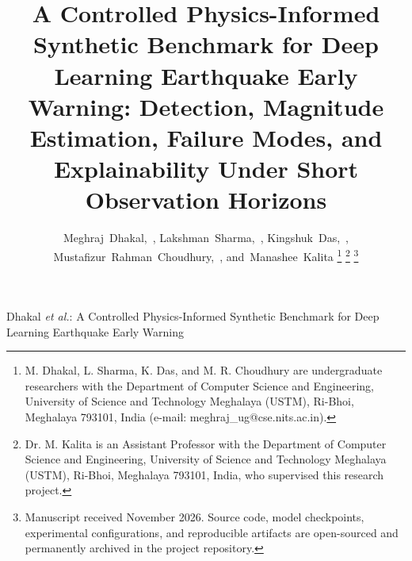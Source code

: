 \documentclass[journal]{IEEEtran}
\begin{document}
\title{A Controlled Physics-Informed Synthetic Benchmark for Deep Learning Earthquake Early Warning: Detection, Magnitude Estimation, Failure Modes, and Explainability Under Short Observation Horizons}

\author{Meghraj~Dhakal,~,
        Lakshman~Sharma,~,
        Kingshuk~Das,~,
        Mustafizur~Rahman~Choudhury,~,
        and~Manashee~Kalita%
\thanks{M. Dhakal, L. Sharma, K. Das, and M. R. Choudhury are undergraduate researchers with the Department of Computer Science and Engineering, University of Science and Technology Meghalaya (USTM), Ri-Bhoi, Meghalaya 793101, India (e-mail: meghraj\_ug@cse.nits.ac.in).}%
\thanks{Dr. M. Kalita is an Assistant Professor with the Department of Computer Science and Engineering, University of Science and Technology Meghalaya (USTM), Ri-Bhoi, Meghalaya 793101, India, who supervised this research project.}%
\thanks{Manuscript received November 2026. Source code, model checkpoints, experimental configurations, and reproducible artifacts are open-sourced and permanently archived in the project repository.}%
}

%
{Dhakal \MakeLowercase{\textit{et al.}}: A Controlled Physics-Informed Synthetic Benchmark for Deep Learning Earthquake Early Warning}

\maketitle
\end{document}
